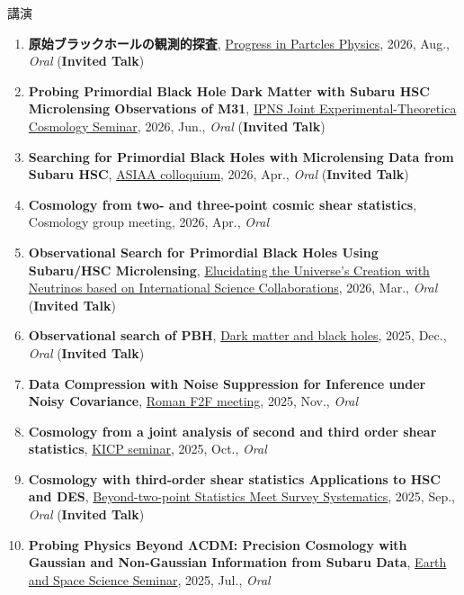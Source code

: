 \begin{rSection}{講演}
\begin{enumerate}[itemsep=0pt, parsep=0pt, topsep=0pt, partopsep=0pt]
\item \textbf{原始ブラックホールの観測的探査}, \href{https://indico.yukawa.kyoto-u.ac.jp/event/95/overview}{Progress in Partcles Physics}, 2026, Aug., \textit{Oral} (\textbf{Invited Talk})
\item \textbf{Probing Primordial Black Hole Dark Matter with Subaru HSC Microlensing Observations of M31}, \href{https://cosmophysics.gitlab.io/jointseminar.gitlab.io/sugiyama20260615.html}{IPNS Joint Experimental-Theoretica Cosmology Seminar}, 2026, Jun., \textit{Oral} (\textbf{Invited Talk})
\item \textbf{Searching for Primordial Black Holes with Microlensing Data from Subaru HSC}, \href{https://www.asiaa.sinica.edu.tw/activity/colloquium.php}{ASIAA colloquium}, 2026, Apr., \textit{Oral} (\textbf{Invited Talk})
\item \textbf{Cosmology from two- and three-point cosmic shear statistics}, Cosmology group meeting, 2026, Apr., \textit{Oral}
\item \textbf{Observational Search for Primordial Black Holes Using Subaru/HSC Microlensing}, \href{https://www-kam2.icrr.u-tokyo.ac.jp/event/19/}{Elucidating the Universe's Creation with Neutrinos based on International Science Collaborations}, 2026, Mar., \textit{Oral} (\textbf{Invited Talk})
\item \textbf{Observational search of PBH}, \href{https://indico.ipmu.jp/event/464/timetable/#20251205}{Dark matter and black holes}, 2025, Dec., \textit{Oral} (\textbf{Invited Talk})
\item \textbf{Data Compression with Noise Suppression 
for Inference under Noisy Covariance}, \href{https://roman-hlis-cosmology.caltech.edu/news/2024-f2f}{Roman F2F meeting}, 2025, Nov., \textit{Oral}
\item \textbf{Cosmology from a joint analysis of second and third order shear statistics}, \href{https://astrophysics.uchicago.edu/events/event/2530/?past=y}{KICP seminar}, 2025, Oct., \textit{Oral}
\item \textbf{Cosmology with third-order shear statistics Applications to HSC and DES}, \href{https://indico.ipmu.jp/event/460/overview}{Beyond-two-point Statistics Meet Survey Systematics}, 2025, Sep., \textit{Oral} (\textbf{Invited Talk})
\item \textbf{Probing Physics Beyond ΛCDM: Precision Cosmology with Gaussian and Non-Gaussian Information from Subaru Data}, \href{https://www.ess.sci.osaka-u.ac.jp/researchers/seminar.html}{Earth and Space Science Seminar}, 2025, Jul., \textit{Oral}

\end{enumerate}
\end{rSection}

